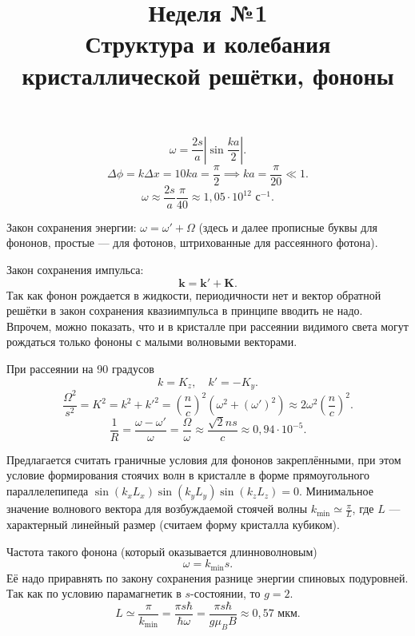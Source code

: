 \documentclass[a4paper]{article}
\title{Неделя №1\\
Структура и колебания кристаллической решётки, фононы}
\begin{document}
	\maketitle
\begin{hiProb}[2.20]
\end{hiProb}
\begin{sol}
\[
\omega = \frac{2s}{a} \left| \sin \frac{ka}{2} \right| 
.\] 
\[
\Delta \phi= k \Delta x= 10 ka= \frac{\pi}{2}\implies
 ka= \frac{\pi}{20} \ll 1
.\]
\[
	\omega \approx  \frac{2s}{a} \frac{\pi }{40} 
	\approx 1,05 \cdot 10^12 \text{ с}^{-1}
.\] 
\end{sol}
\begin{hiProb}[2.62]
\end{hiProb}
\begin{sol}
Закон сохранения энергии: $\omega=\omega'+\Omega$ 
(здесь и далее прописные буквы для фононов, простые
--- для фотонов, штрихованные для рассеянного фотона).

Закон сохранения импульса:
\[
	\mathbf{k}= \mathbf{k}'+ \mathbf{K}
.\] 
Так как фонон рождается в жидкости, периодичности нет
и вектор обратной решётки в закон сохранения квазиимпульса в принципе вводить не надо. Впрочем, можно
показать, что и в кристалле при рассеянии видимого
света могут рождаться только фононы с малыми
волновыми векторами.

При рассеянии на 90 градусов
\[
k=K_z,\quad k'=-K_y
.\] 
\[
	\frac{\Omega^2}{s^2}= K^2=k^2+k'^2= \left( 
	\frac{n}{c}\right) ^2 \left( 
\omega^2 +(\omega')^2\right) \approx
2\omega^2 \left( \frac{n}{c} \right) ^2
.\] 
\[
\frac{1}{R}= \frac{\omega - \omega'}{\omega}=
\frac{\Omega}{\omega} \approx \frac{\sqrt{2} n s}{c}
\approx 0,94\cdot 10^{-5}
.\] 
\end{sol}
\begin{hiProb}[2.77]
\end{hiProb}
\begin{sol}
Предлагается считать граничные условия для фононов
закреплёнными, при этом условие формирования стоячих
волн в кристалле в форме прямоугольного параллелепипеда
$\sin \left( k_x L_x \right) \sin \left( k_y L_y \right) \sin \left( k_z L_z \right) =0$. Минимальное
значение волнового вектора для возбуждаемой 
стоячей волны $k_\text{min} \simeq \frac{\pi}{L}$, где
$L$ --- характерный линейный размер (считаем
форму кристалла кубиком).

Частота такого фонона (который оказывается длинноволновым)
\[
\omega= k_{\text{min}} s
.\] 
Её надо приравнять по закону сохранения разнице энергии
спиновых подуровней. Так как по условию парамагнетик
в $s$-состоянии, то $g=2$.
\[
L \simeq \frac{\pi}{k_{\text{min}}}
=\frac{\pi s \hbar  }{\hbar \omega} = \frac{
\pi s \hbar }{g \mu_{B} B}\approx 0,57 \text{ мкм}
.\] 
\end{sol}
\end{document}
